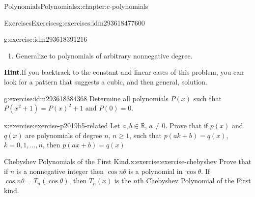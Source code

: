 \documentclass[twoside,10pt,]{book}
\newcommand{\blocktitlefont}{\relax}
\numberwithin{equation}{section}
\newcommand{\RR}{\mathbb{R}}
\begin{document}
\begin{chapterptx}{Polynomials}{}{Polynomials}{}{}{x:chapter:c-polynomials}
\begin{exercises-section}{Exercises}{}{Exercises}{}{}{g:exercises:idm293618477600}
\begin{divisionexercise}{12}{}{}{g:exercise:idm293618391216}
\begin{enumerate}[label=(\alph*)]
\item{}Generalize to polynomials of arbitrary nonnegative degree.%
\end{enumerate}
%
\par\smallskip%
\noindent\textbf{\blocktitlefont Hint}.\label{g:hint:idm293618388336}{}\hypertarget{g:hint:idm293618388336}{}\quad{}If you backtrack to the constant and linear cases of this problem, you can look for a pattern that suggests a cubic, and then general, solution.%
\end{divisionexercise}%
\begin{divisionexercise}{13}{}{}{g:exercise:idm293618384368}%
Determine all polynomials \(P(x)\) such that \(P\left(x^2+1\right)=P(x)^2+1\) and \(P(0)=0\).%
\end{divisionexercise}%
\begin{divisionexercise}{14}{}{}{x:exercise:exercise-p2019b5-related}%
Let \(a, b \in \RR\), \(a \neq 0\). Prove that if \(p(x)\) and \(q(x)\) are polynomials of degree \(n\), \(n \geq 1\), such that \(p(a k +b)=q(x)\), \(k = 0, 1, \dots, n\), then \(p(a x + b)=q(x)\)%
\end{divisionexercise}%
\begin{divisionexercise}{15}{Chebyshev Polynomials of the First Kind.}{}{x:exercise:exercise-chebyshev}%
%
Prove that if \(n\) is a nonnegative integer then \(\cos{n \theta}\)  is a polynomial in \(\cos{\theta}\). If \(\cos{n \theta} = T_n(\cos{\theta})\), then \(T_n(x)\) is the \(n\)th Chebyshev Polynomial of the First kind.%
\end{divisionexercise}%
\end{exercises-section}
\end{chapterptx}
%
%
\typeout{************************************************}
\typeout{************************************************}
%
\end{document}
